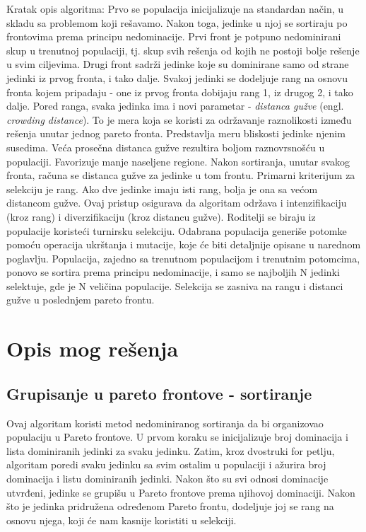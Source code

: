 \documentclass[12pt]{article}
\begin{document}
Kratak opis algoritma:
Prvo se populacija inicijalizuje na standardan način, u skladu sa problemom koji rešavamo. Nakon toga, jedinke u njoj se sortiraju po frontovima prema principu nedominacije. Prvi front je potpuno nedominirani skup u trenutnoj populaciji, tj. skup svih rešenja od kojih ne postoji bolje rešenje u svim ciljevima. Drugi front sadrži jedinke koje su dominirane samo od strane jedinki iz prvog fronta, i tako dalje. Svakoj jedinki se dodeljuje rang na osnovu fronta kojem pripadaju - one iz prvog fronta dobijaju rang 1, iz drugog 2, i tako dalje.
Pored ranga, svaka jedinka ima i novi parametar - \textit{distanca gužve} (engl. \textit{crowding distance}). To je mera koja se koristi za održavanje raznolikosti između rešenja unutar jednog pareto fronta. Predstavlja meru bliskosti jedinke njenim susedima. Veća prosečna distanca gužve rezultira boljom raznovrsnošću u populaciji. Favorizuje manje naseljene regione. Nakon sortiranja, unutar svakog fronta, računa se distanca gužve za jedinke u tom frontu.
Primarni kriterijum za selekciju je rang. Ako dve jedinke imaju isti rang, bolja je ona sa većom distancom gužve.
Ovaj pristup osigurava da algoritam održava i intenzifikaciju (kroz rang) i diverzifikaciju (kroz distancu gužve).
Roditelji se biraju iz populacije koristeći turnirsku selekciju. Odabrana populacija generiše potomke pomoću operacija ukrštanja i mutacije, koje će biti detaljnije opisane u narednom poglavlju.
Populacija, zajedno sa trenutnom populacijom i trenutnim potomcima, ponovo se sortira prema principu nedominacije, i samo se najboljih N jedinki selektuje, gde je N veličina populacije. Selekcija se zasniva na rangu i distanci gužve u poslednjem pareto frontu.

\section{Opis mog rešenja}
\subsection{Grupisanje u pareto frontove - sortiranje}
Ovaj algoritam koristi metod nedominiranog sortiranja da bi organizovao populaciju u Pareto frontove. U prvom koraku se inicijalizuje broj dominacija i lista dominiranih jedinki za svaku jedinku. Zatim, kroz dvostruki for petlju, algoritam poredi svaku jedinku sa svim ostalim u populaciji i ažurira broj dominacija i listu dominiranih jedinki. Nakon što su svi odnosi dominacije utvrđeni, jedinke se grupišu u Pareto frontove prema njihovoj dominaciji. Nakon što je jedinka pridružena određenom Pareto frontu, dodeljuje joj se rang na osnovu njega, koji će nam kasnije koristiti u selekciji.
\end{document}
